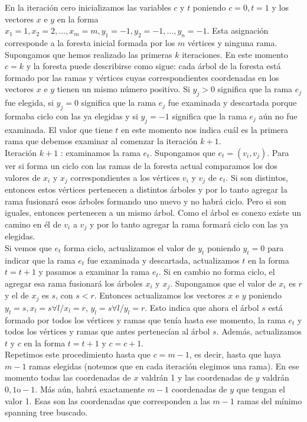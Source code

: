\documentclass[10pt]{article}
\begin{document}
En la iteración cero inicializamos las variables $c$ y $t$ poniendo $c=0, t=1$ y los vectores $x$ e $y$ en la forma $x_{1}=1, x_{2}=2, \ldots, x_{m}=m, y_{1}=-1, y_{2}=-1, \ldots, y_{n}=-1$. Esta asignación corresponde a la foresta inicial formada por los $m$ vértices y ninguna rama.\\
Supongamos que hemos realizado las primeras $k$ iteraciones. En este momento $c=k$ y la foresta puede describirse como sigue: cada árbol de la foresta está formado por las ramas y vértices cuyas correspondientes coordenadas en los vectores $x$ e $y$ tienen un mismo número positivo. Si $y_{j}>0$ significa que la rama $e_{j}$ fue elegida, si $y_{j}=0$ significa que la rama $e_{j}$ fue examinada y descartada porque formaba ciclo con las ya elegidas y si $y_{j}=-1$ significa que la rama $e_{j}$ aún no fue examinada. El valor que tiene $t$ en este momento nos indica cuál es la primera rama que debemos examinar al comenzar la iteración $k+1$.\\
Iteración $k+1$ : examinamos la rama $e_{t}$. Supongamos que $e_{t}=\left(v_{i}, v_{j}\right)$. Para ver si forma un ciclo con las ramas de la foresta actual comparamos los dos valores de $x_{i}$ y $x_{j}$ correspondientes a los vértices $v_{i}$ y $v_{j}$ de $e_{t}$. Si son distintos, entonces estos vértices pertenecen a distintos árboles y por lo tanto agregar la rama fusionará esos árboles formando uno nuevo y no habrá ciclo. Pero si son iguales, entonces pertenecen a un mismo árbol. Como el árbol es conexo existe un camino en él de $v_{i}$ a $v_{j}$ y por lo tanto agregar la rama formará ciclo con las ya elegidas.\\
Si vemos que $e_{t}$ forma ciclo, actualizamos el valor de $y_{t}$ poniendo $y_{t}=0$ para indicar que la rama $e_{t}$ fue examinada y descartada, actualizamos $t$ en la forma $t=t+1$ y pasamos a examinar la rama $e_{t}$. Si en cambio no forma ciclo, el agregar esa rama fusionará los árboles $x_{i}$ y $x_{j}$. Supongamos que el valor de $x_{i}$ es $r$ y el de $x_{j}$ es $s$, con $s<r$. Entonces actualizamos los vectores $x$ e $y$ poniendo $y_{t}=s, x_{l}=s \forall l / x_{l}=r$, $y_{l}=s \forall l / y_{l}=r$. Esto indica que ahora el árbol $s$ está formado por todos los vértices y ramas que tenía hasta ese momento, la rama $e_{t}$ y todos los vértices y ramas que antes pertenecían al árbol $s$. Además, actualizamos $t$ y $c$ en la forma $t=t+1$ y $c=c+1$.\\
Repetimos este procedimiento hasta que $c=m-1$, es decir, hasta que haya $m-1$ ramas elegidas (notemos que en cada iteración elegimos una rama). En ese momento todas las coordenadas de $x$ valdrán 1 y las coordenadas de $y$ valdrán $0,1 \mathrm{o}-1$. Más aún, habrá exactamente $m-1$ coordenadas de $y$ que tengan el valor 1. Esas son las coordenadas que corresponden a las $m-1$ ramas del mínimo spanning tree buscado.
\end{document}
